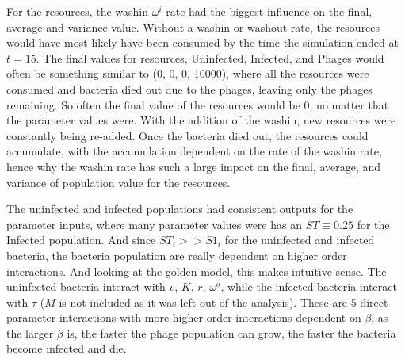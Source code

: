 For the resources, the washin $\omega^i$ rate had the biggest influence on the final, average and variance value. 
Without a washin or washout rate, the resources would have most likely have been consumed by the time the simulation ended at $t=15$. 
The final values for resources, Uninfected, Infected, and Phages would often be something similar to (0, 0, 0, 10000), where all the resources were consumed and bacteria died out due to the phages, leaving only the phages remaining. 
So often the final value of the resources would be 0, no matter that the parameter values were. 
With the addition of the washin, new resources were constantly being re-added. 
Once the bacteria died out, the resources could accumulate, with the accumulation dependent on the rate of the washin rate, hence why the washin rate has such a large impact on the final, average, and variance of population value for the resources. 

The uninfected and infected populations had consistent outputs for the parameter inputs, where many parameter values were has an $ST \equiv 0.25$ for the Infected population. 
And since $ST_i >> S1_i$ for the uninfected and infected bacteria, the bacteria population are really dependent on higher order interactions. 
And looking at the golden model, this makes intuitive sense. 
The uninfected bacteria interact with $v$, $K$, $r$, $\omega^o$, while the infected bacteria interact with $\tau$ ($M$ is not included as it was left out of the analysis). 
These are 5 direct parameter interactions with more higher order interactions dependent on $\beta$, as the larger $\beta$ is, the faster the phage population can grow, the faster the bacteria become infected and die.   



